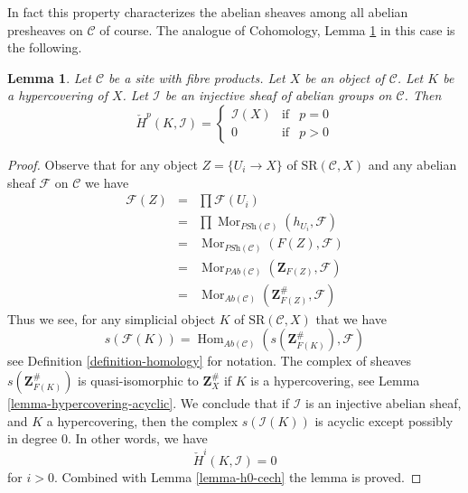 \documentclass{stacks-project}
\theoremstyle{plain}
\newtheorem{lemma}[subsection]{Lemma}
\theoremstyle{definition}
\theoremstyle{remark}
\numberwithin{equation}{subsection}
\def\Hom{\mathop{\mathrm{Hom}}\nolimits}
\def\Mor{\mathop{\mathrm{Mor}}\nolimits}
\begin{document}
\noindent
In fact this property characterizes the abelian sheaves among all
abelian presheaves on $\mathcal{C}$ of course.
The analogue of Cohomology, Lemma \ref{lemma-injective-trivial-cech}
in this case is the following.

\begin{lemma}
\label{lemma-injective-trivial-cech}
Let $\mathcal{C}$ be a site with fibre products.
Let $X$ be an object of $\mathcal{C}$.
Let $K$ be a hypercovering of $X$.
Let $\mathcal{I}$ be an injective sheaf of abelian groups on $\mathcal{C}$.
Then
$$
\check{H}^p(K, \mathcal{I}) =
\left\{
\begin{matrix}
\mathcal{I}(X) & \text{if} & p = 0 \\
0 & \text{if} & p > 0
\end{matrix}
\right.
$$
\end{lemma}

\begin{proof}
Observe that for any object $Z = \{U_i \to X\}$ of
$\text{SR}(\mathcal{C}, X)$ and any abelian sheaf
$\mathcal{F}$ on $\mathcal{C}$ we have
\begin{eqnarray*}
\mathcal{F}(Z)
& = &
\prod \mathcal{F}(U_i) \\
& = &
\prod \Mor_{\textit{PSh}(\mathcal{C})}(h_{U_i}, \mathcal{F})\\
& = &
\Mor_{\textit{PSh}(\mathcal{C})}(F(Z), \mathcal{F})\\
& = &
\Mor_{\textit{PAb}(\mathcal{C})}(\mathbf{Z}_{F(Z)}, \mathcal{F}) \\
& = &
\Mor_{\textit{Ab}(\mathcal{C})}(\mathbf{Z}_{F(Z)}^\#, \mathcal{F})
\end{eqnarray*}
Thus we see, for any simplicial object $K$ of
$\text{SR}(\mathcal{C}, X)$ that we have
\begin{equation}
\label{equation-identify-cech}
s(\mathcal{F}(K))
=
\Hom_{\textit{Ab}(\mathcal{C})}(s(\mathbf{Z}_{F(K)}^\#), \mathcal{F})
\end{equation}
see Definition \ref{definition-homology} for notation.
The complex of sheaves $s(\mathbf{Z}_{F(K)}^\#)$ is quasi-isomorphic
to $\mathbf{Z}_X^\#$ if $K$ is a hypercovering, see
Lemma \ref{lemma-hypercovering-acyclic}. We conclude
that if $\mathcal{I}$ is an injective abelian sheaf, and
$K$ a hypercovering, then the complex $s(\mathcal{I}(K))$
is acyclic except possibly in degree $0$.
In other words, we have
$$
\check{H}^i(K, \mathcal{I}) = 0
$$
for $i > 0$. Combined with Lemma \ref{lemma-h0-cech} the lemma is proved.
\end{proof}
\end{document}
